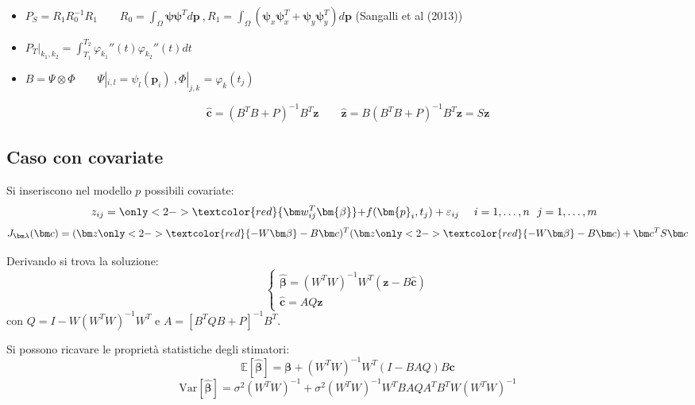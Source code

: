 \documentclass[landscape,9pt]{beamer}                           %
\begin{document}
\begin{frame}
{\begin{itemize}
\item $P_S=R_1 R_0^{-1} R_1 \qquad R_0 = \int_\Omega \bm \psi \bm \psi^T d \bm p \ , R_1 = \int_\Omega (\bm \psi_x \bm \psi_x^T + \bm \psi_y \bm \psi_y^T)d \bm p$ (Sangalli et al (2013))
\item $P_T|_{k_1,k_2} =\int_{T_1}^{T_2} \varphi_{k_1}''(t) \varphi_{k_2}''(t) dt$
\item $B = \Psi \otimes \Phi \qquad \Psi|_{i,l}=\psi_{l}(\bm p_i) \ , \Phi|_{j,k}=\varphi_{k}( t_j)$
\end{itemize}
}
\par\bigskip
{}
{
$$
\boxed{\hat  {\bm c} = (B^T B + P)^{-1}B^T \bm z}
\qquad
\hat  {\bm z} = B(B^T B + P)^{-1}B^T \bm z = S\bm z
$$
}
\end{frame}


\subsection{Caso con covariate}
\begin{frame}
Si inseriscono nel modello $p$ possibili covariate:
$$
z_{ij}=\only<2->{\textcolor{red}{\bm w_{ij}^T \bm{\beta}} + } f(\bm{p}_i,t_j)+\varepsilon_{ij}\ \ \ \ i = 1,\ldots,n\ \ j=1,\ldots,m \ \ 
$$
$$
J_{\bm \lambda }(\bm c) = (\bm z \only<2->{\textcolor{red}{- W \bm \beta}} - B \bm c)^T (\bm z \only<2->{\textcolor{red}{- W \bm \beta}} - B \bm c) + \bm c^T S \bm c
$$
\uncover<3->
{
Derivando si trova la soluzione:
$$
\boxed{\begin{cases}
\hat{\bm \beta} = (W^TW)^{-1}W^T(\bm z - B \hat{\bm c}) \\
\hat  {\bm c} = AQ \bm z
\end{cases}}
$$
con $Q=I-W(W^TW)^{-1}W^T $ e $A=[B^TQB+P]^{-1}B^T$.
\par\bigskip
}
{
Si possono ricavare le proprietà statistiche degli stimatori:
$$
\mathbb{E}[\hat  {\bm \beta}] = \bm \beta + (W^TW)^{-1}W^T(I-B AQ)B\bm c
$$
$$
\mathrm{Var}[\hat  {\bm \beta}] = \sigma^2 (W^TW)^{-1} + \sigma^2 (W^TW)^{-1}W^T B A Q A^T B^T W(W^TW)^{-1}
$$
}
\end{frame}
\end{document}
